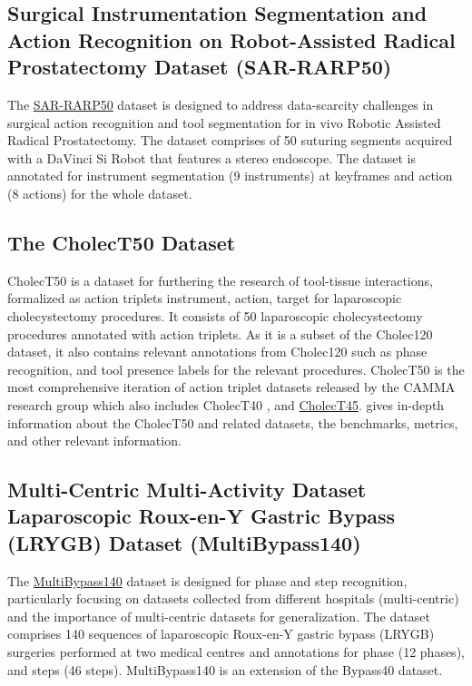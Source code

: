 \subsection{Surgical Instrumentation Segmentation and Action Recognition on Robot-Assisted Radical Prostatectomy Dataset (SAR-RARP50)}
The \href{https://www.synapse.org/#!Synapse:syn27618412/wiki/616881}{SAR-RARP50} dataset \citep{psychogyios2023sar} is designed to address data-scarcity challenges in surgical action recognition and tool segmentation for in vivo Robotic Assisted Radical Prostatectomy. The dataset comprises of 50 suturing segments acquired with a DaVinci Si Robot that features a stereo endoscope. The dataset is annotated for instrument segmentation (9 instruments) at keyframes and action (8 actions) for the whole dataset.




\subsection{The CholecT50 Dataset}
CholecT50 \citep{NWOYE2022102433_rendevous} is a dataset for furthering the research of tool-tissue interactions, formalized as action triplets \textlangle{}instrument, action, target\textrangle{} for laparoscopic cholecystectomy procedures. 
It consists of 50 laparoscopic cholecystectomy procedures annotated with action triplets. As it is a subset of the Cholec120 dataset, it also contains relevant annotations from Cholec120 such as phase recognition, and tool presence labels for the relevant procedures. CholecT50 is the most comprehensive iteration of action triplet datasets released by the CAMMA research group which also includes  CholecT40 \citep{1nywoye_rec_action_triplets}, and \href{https://github.com/CAMMA-public/cholect45}{CholecT45}. \citet{nwoye2022data} gives in-depth information about the CholecT50 and related datasets, the benchmarks, metrics, and other relevant information.

\subsection{Multi-Centric Multi-Activity Dataset Laparoscopic Roux-en-Y Gastric Bypass (LRYGB) Dataset (MultiBypass140)}
The \href{https://github.com/CAMMA-public/MultiBypass140}{MultiBypass140} dataset \citep{Lavanchy2024} is designed for phase and step recognition, particularly focusing on datasets collected from different hospitals (multi-centric) and the importance of multi-centric datasets for generalization. 
The dataset comprises 140 sequences of laparoscopic Roux-en-Y gastric bypass (LRYGB) surgeries performed at two medical centres and annotations for phase (12 phases), and steps (46 steps). MultiBypass140 is an extension of the Bypass40 \cite{Ramesh2021_phase_step_gastric_bypass} dataset.

